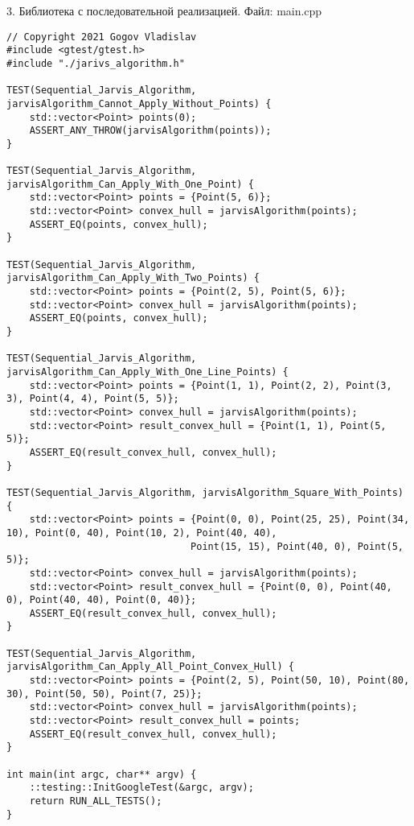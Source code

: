 \documentclass{report}
\begin{document}
\par 3. Библиотека с последовательной реализацией. Файл: main.cpp
\begin{lstlisting}
// Copyright 2021 Gogov Vladislav
#include <gtest/gtest.h>
#include "./jarivs_algorithm.h"

TEST(Sequential_Jarvis_Algorithm, jarvisAlgorithm_Cannot_Apply_Without_Points) {
    std::vector<Point> points(0);
    ASSERT_ANY_THROW(jarvisAlgorithm(points));
}

TEST(Sequential_Jarvis_Algorithm, jarvisAlgorithm_Can_Apply_With_One_Point) {
    std::vector<Point> points = {Point(5, 6)};
    std::vector<Point> convex_hull = jarvisAlgorithm(points);
    ASSERT_EQ(points, convex_hull);
}

TEST(Sequential_Jarvis_Algorithm, jarvisAlgorithm_Can_Apply_With_Two_Points) {
    std::vector<Point> points = {Point(2, 5), Point(5, 6)};
    std::vector<Point> convex_hull = jarvisAlgorithm(points);
    ASSERT_EQ(points, convex_hull);
}

TEST(Sequential_Jarvis_Algorithm, jarvisAlgorithm_Can_Apply_With_One_Line_Points) {
    std::vector<Point> points = {Point(1, 1), Point(2, 2), Point(3, 3), Point(4, 4), Point(5, 5)};
    std::vector<Point> convex_hull = jarvisAlgorithm(points);
    std::vector<Point> result_convex_hull = {Point(1, 1), Point(5, 5)};
    ASSERT_EQ(result_convex_hull, convex_hull);
}

TEST(Sequential_Jarvis_Algorithm, jarvisAlgorithm_Square_With_Points) {
    std::vector<Point> points = {Point(0, 0), Point(25, 25), Point(34, 10), Point(0, 40), Point(10, 2), Point(40, 40),
                                Point(15, 15), Point(40, 0), Point(5, 5)};
    std::vector<Point> convex_hull = jarvisAlgorithm(points);
    std::vector<Point> result_convex_hull = {Point(0, 0), Point(40, 0), Point(40, 40), Point(0, 40)};
    ASSERT_EQ(result_convex_hull, convex_hull);
}

TEST(Sequential_Jarvis_Algorithm, jarvisAlgorithm_Can_Apply_All_Point_Convex_Hull) {
    std::vector<Point> points = {Point(2, 5), Point(50, 10), Point(80, 30), Point(50, 50), Point(7, 25)};
    std::vector<Point> convex_hull = jarvisAlgorithm(points);
    std::vector<Point> result_convex_hull = points;
    ASSERT_EQ(result_convex_hull, convex_hull);
}

int main(int argc, char** argv) {
    ::testing::InitGoogleTest(&argc, argv);
    return RUN_ALL_TESTS();
}
\end{lstlisting}
\end{document}
